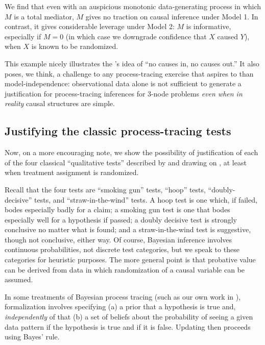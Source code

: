 \documentclass[
  12pt,
]{book}
\begin{document}
We find that even with an auspicious monotonic data-generating process in which \(M\) is a total mediator, \(M\) gives no traction on causal inference under Model 1. In contrast, it gives considerable leverage under Model 2: \(M\) is informative, especially if \(M=0\) (in which case we downgrade confidence that \(X\) caused \(Y\)), when \(X\) is known to be randomized.

This example nicely illustrates the \citet{cartwright1994nature}'s idea of ``no causes in, no causes out.'' It also poses, we think, a challenge to any process-tracing exercise that aspires to than model-independence: observational data alone is not sufficient to generate a justification for process-tracing inferences for 3-node problems \emph{even when in reality} causal structures are simple.

\hypertarget{justifying-the-classic-process-tracing-tests}{%
\subsection{Justifying the classic process-tracing tests}\label{justifying-the-classic-process-tracing-tests}}

Now, on a more encouraging note, we show the possibility of justification of each of the four classical ``qualitative tests'' described by \citet{collier2011understanding} and drawing on \citet{Van-Evera:1997}, at least when treatment assignment is randomized.

Recall that the four tests are ``smoking gun'' tests, ``hoop'' tests, ``doubly-decisive'' tests, and ``straw-in-the-wind'' tests. A hoop test is one which, if failed, bodes especially badly for a claim; a smoking gun test is one that bodes especially well for a hypothesis if passed; a doubly decisive test is strongly conclusive no matter what is found; and a straw-in-the-wind test is suggestive, though not conclusive, either way. Of course, Bayesian inference involves continuous probabilities, not discrete test categories, but we speak to these categories for heuristic purposes. The more general point is that probative value can be derived from data in which randomization of a causal variable can be assumed.

In some treatments of Bayesian process tracing (such as our own work in \citet{humphreys2015mixing}), formalization involves specifying (a) a prior that a hypothesis is true and, \emph{independently} of that (b) a set of beliefs about the probability of seeing a given data pattern if the hypothesis is true and if it is false. Updating then proceeds using Bayes' rule.
\end{document}

